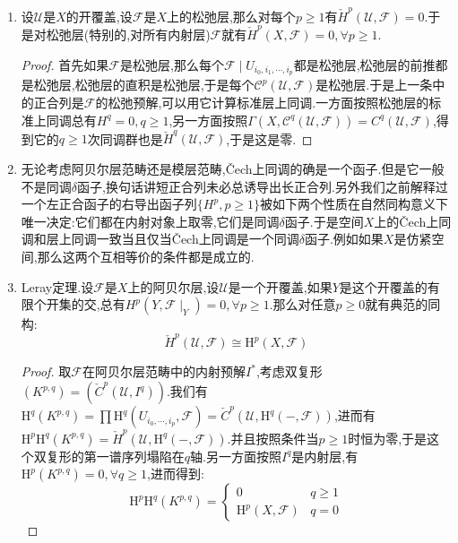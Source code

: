 \begin{enumerate}
\begin{proof}
		假设$x\in U_j$,任取$\alpha_x\in\mathscr{C}^p(\mathscr{U},\mathscr{F})_x$,它可以表示为$x$的某个开邻域$V$上的层$\mathscr{C}^p(\mathscr{U},\mathscr{F})$的截面$\alpha$.另外我们可以不妨设$V\subset U_j$.对每个$i_0<i_1<\cdots<i_{p-1}$,定义$(k\alpha)_{i_0,i_1,\cdots,i_{p-1}}=\alpha_{j,i_0,\cdots,i_{p-1}}$.这里我们约定对一个双射$\sigma$有$\alpha_{\sigma i_0,\sigma i_1,\cdots,\sigma i_p}=(-1)^{\mathrm{sgn}\sigma}\alpha_{i_0,i_1,\cdots,i_p}$.这个定义有意义因为$V\cap U_{i_0,i_1,\cdots,i_{p-1}}=V\cap U_{j,i_0,i_1,\cdots,i_{p-1}}$.最后容易验证对任意$p\ge1$和任意$\alpha\in\mathscr{C}_x^p$有$(d\circ k+k\circ d)(\alpha)=\alpha$.
	\end{proof}
	\item 设$\mathscr{U}$是$X$的开覆盖,设$\mathscr{F}$是$X$上的松弛层,那么对每个$p\ge1$有$\check{H}^p(\mathscr{U},\mathscr{F})=0$.于是对松弛层(特别的,对所有内射层)$\mathscr{F}$就有$\check{H}^p(X,\mathscr{F})=0,\forall p\ge1$.
	\begin{proof}
		
		首先如果$\mathscr{F}$是松弛层,那么每个$\mathscr{F}\mid U_{i_0,i_1,\cdots,i_p}$都是松弛层,松弛层的前推都是松弛层,松弛层的直积是松弛层,于是每个$\mathscr{C}^p(\mathscr{U},\mathscr{F})$是松弛层.于是上一条中的正合列是$\mathscr{F}$的松弛预解,可以用它计算标准层上同调.一方面按照松弛层的标准上同调总有$H^q=0,q\ge1$,另一方面按照$\Gamma(X,\mathscr{C}^q(\mathscr{U},\mathscr{F}))=C^q(\mathscr{U},\mathscr{F})$,得到它的$q\ge1$次同调群也是$\check{H}^q(\mathscr{U},\mathscr{F})$,于是这是零.
	\end{proof}
	\item 无论考虑阿贝尔层范畴还是模层范畴,\v{C}ech上同调的确是一个函子.但是它一般不是同调$\delta$函子,换句话讲短正合列未必总诱导出长正合列.另外我们之前解释过一个左正合函子的右导出函子列$\{H^p,p\ge1\}$被如下两个性质在自然同构意义下唯一决定:它们都在内射对象上取零,它们是同调$\delta$函子.于是空间$X$上的\v{C}ech上同调和层上同调一致当且仅当\v{C}ech上同调是一个同调$\delta$函子.例如如果$X$是仿紧空间,那么这两个互相等价的条件都是成立的.
	\item Leray定理.设$\mathscr{F}$是$X$上的阿贝尔层,设$\mathscr{U}$是一个开覆盖,如果$Y$是这个开覆盖的有限个开集的交,总有$H^p(Y,\mathscr{F}\mid_Y)=0,\forall p\ge1$.那么对任意$p\ge0$就有典范的同构:$$\check{H}^p(\mathscr{U},\mathscr{F})\cong\mathrm{H}^p(X,\mathscr{F})$$
	\begin{proof}
		
		取$\mathscr{F}$在阿贝尔层范畴中的内射预解$I^*$,考虑双复形$(K^{p,q})=(\check{C}^p(\mathscr{U},I^q))$.我们有$\mathrm{H}^q(K^{p,q})=\prod\mathrm{H}^q(U_{i_0,\cdots,i_p},\mathscr{F})=\check{C}^p(\mathscr{U},\mathrm{H}^q(-,\mathscr{F}))$,进而有$\mathrm{H}^p\mathrm{H}^q(K^{p,q})=\check{H}^p(\mathscr{U},\mathrm{H}^q(-,\mathscr{F}))$.并且按照条件当$p\ge1$时恒为零,于是这个双复形的第一谱序列塌陷在$q$轴.另一方面按照$I^q$是内射层,有$\mathrm{H}^p(K^{p,q})=0,\forall q\ge1$,进而得到:
		$$\mathrm{H}^p\mathrm{H}^q(K^{p,q})=\left\{\begin{array}{cc}0&q\ge1\\\mathrm{H}^p(X,\mathscr{F})&q=0\end{array}\right.$$
		

\end{proof}
\end{enumerate}
